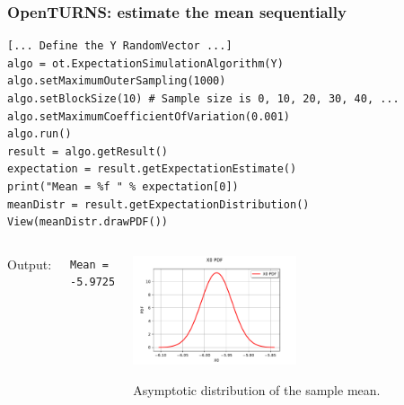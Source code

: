 \documentclass{beamer}
\begin{document}


\begin{frame}[containsverbatim]
\frametitle{OpenTURNS: estimate the mean sequentially}

\scriptsize{

\lstset{language=python}
\begin{lstlisting}
[... Define the Y RandomVector ...]
algo = ot.ExpectationSimulationAlgorithm(Y)
algo.setMaximumOuterSampling(1000)
algo.setBlockSize(10) # Sample size is 0, 10, 20, 30, 40, ...
algo.setMaximumCoefficientOfVariation(0.001)
algo.run()
result = algo.getResult()
expectation = result.getExpectationEstimate()
print("Mean = %f " % expectation[0])
meanDistr = result.getExpectationDistribution()
View(meanDistr.drawPDF())
\end{lstlisting}

\begin{columns}

	Output:
\begin{lstlisting}
Mean = -5.972516 
\end{lstlisting}


	\begin{center}
	\includegraphics[width=0.5\textwidth]{figures/MeanDistribution.pdf}
	
	Asymptotic distribution of the sample mean.
	\end{center}
	
\end{columns}

}



\end{frame}
\end{document}
